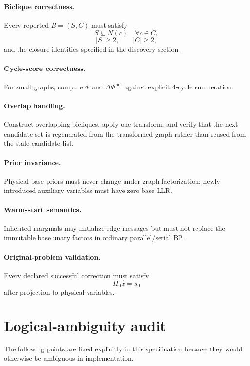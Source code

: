 \documentclass[11pt,a4paper]{article}
\begin{document}
\paragraph{Biclique correctness.}
Every reported $B=(S,C)$ must satisfy
\[
S\subseteq N(c)
\quad\forall c\in C,
\]
\[
|S|\ge2,\qquad |C|\ge2,
\]
and the closure identities specified in the discovery section.

\paragraph{Cycle-score correctness.}
For small graphs, compare $\Phi$ and $\Delta\Phi^{\mathrm{net}}$ against explicit
4-cycle enumeration.

\paragraph{Overlap handling.}
Construct overlapping bicliques, apply one transform, and verify that the next
candidate set is regenerated from the transformed graph rather than reused
from the stale candidate list.

\paragraph{Prior invariance.}
Physical base priors must never change under graph factorization; newly
introduced auxiliary variables must have zero base LLR.

\paragraph{Warm-start semantics.}
Inherited marginals may initialize edge messages but must not replace the
immutable base unary factors in ordinary parallel/serial BP.

\paragraph{Original-problem validation.}
Every declared successful correction must satisfy
\[
H_0\hat x=s_0
\]
after projection to physical variables.

\section{Logical-ambiguity audit}

The following points are fixed explicitly in this specification because they
would otherwise be ambiguous in implementation.
\end{document}

